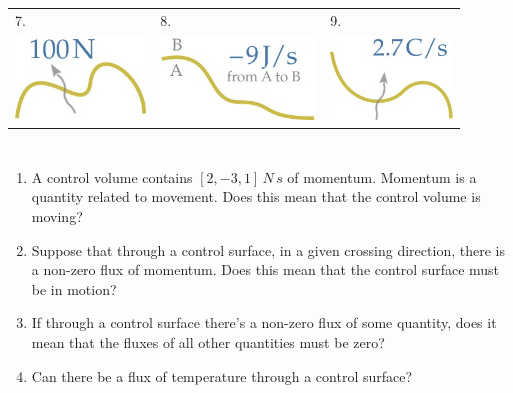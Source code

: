 \documentclass[a4paper,12pt,%
onecolumn,oneside,%
british%
]{memoir}
\renewcommand*{\|}[1][]{\nonscript\:#1\vert\nonscript\:\mathopen{}}
\begin{document}
\begin{tabularx}{\linewidth}[h]{XXX}
\\[10ex]
7.&8.&9.
\\
  \includegraphics[align=c, height=6em,width=0.25\linewidth,keepaspectratio]{images/flux_scalar_8.jpg}
&  \includegraphics[align=c, height=6em,width=0.25\linewidth,keepaspectratio]{images/flux_scalar_9.jpg}
&  \includegraphics[align=c, height=6em,width=0.25\linewidth,keepaspectratio]{images/flux_scalar_10.jpg}
\end{tabularx}

\medskip

\section{}
\label{sec:surface_moves_if_flux}

\begin{enumerate}[exerc]
\item A control volume contains $[2,-3,1]\,\unit{N\,s}$ of momentum. Momentum is a quantity related to movement. Does this mean that the control volume is moving?
\item Suppose that through a control surface, in a given crossing direction, there is a non-zero flux of momentum. Does this mean that the control surface must be in motion?
\item If through a control surface there's a non-zero flux of some quantity, does it mean that the fluxes of all other quantities must be zero?

\item Can there be a flux of temperature through a control surface?
\end{enumerate}

\section{}
\label{sec:fluxes_vector}
\end{document}
